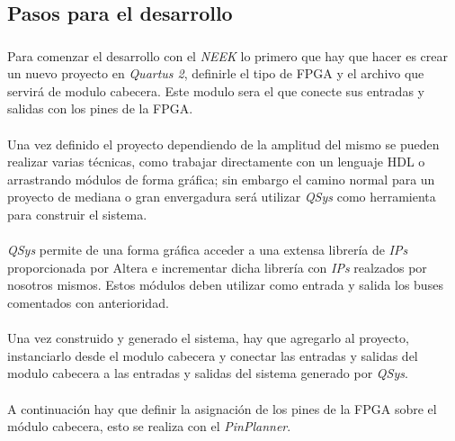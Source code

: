 \documentclass[a4paper,12pt,titlepage,final]{book}
\begin{document}
\subsection{Pasos para el desarrollo}
\subsubsection*{}
\paragraph{}
Para comenzar el desarrollo con el \textit{NEEK} lo primero que hay que hacer es crear un nuevo proyecto en \textit{Quartus 2}, definirle el tipo de FPGA y el archivo que servirá de modulo cabecera. Este modulo sera el que conecte sus entradas y salidas con los pines de la FPGA.

\paragraph{}
Una vez definido el proyecto dependiendo de la amplitud del mismo se pueden realizar varias técnicas, como trabajar directamente con un lenguaje HDL o arrastrando módulos de forma gráfica; sin embargo el camino normal para un proyecto de mediana o gran envergadura será utilizar \textit{QSys} como herramienta para construir el sistema.

\paragraph{}
\textit{QSys} permite de una forma gráfica acceder a una extensa librería de \textit{IPs} proporcionada por Altera e incrementar dicha librería con \textit{IPs} realzados por nosotros mismos. Estos módulos deben utilizar como entrada y salida los buses comentados con anterioridad.

\paragraph{}
Una vez construido y generado el sistema, hay que agregarlo al proyecto, instanciarlo desde el modulo cabecera y conectar las entradas y salidas del modulo cabecera a las entradas y salidas del sistema generado por \textit{QSys}.

\paragraph{}
A continuación hay que definir la asignación de los pines de la FPGA sobre el módulo cabecera, esto se realiza con el \textit{PinPlanner}.
\end{document}
